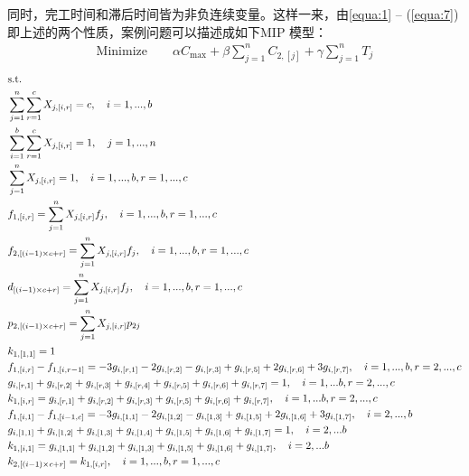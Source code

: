 同时，完工时间和滞后时间皆为非负连续变量。这样一来，由\eqref{equa:1} -- (\ref{equa:7})即上述的两个性质，案例问题可以描述成如下MIP 模型：
\begin{gather}
\text{Minimize}\qquad \alpha C_{\max}+\beta\sum_{j=1}^n C_{2,[j]}+\gamma\sum_{j=1}^n T_j \label{equa:8}
\end{gather}
\begin{align}
&\text{s.t.}\notag\\
& \sum_{j=1}^n\sum_{r=1}^c X_{j,[i,r]} = c,\quad i=1,...,b\label{equa:9}\\
& \sum_{i=1}^b\sum_{r=1}^c X_{j,[i,r]} = 1,\quad j=1,...,n\label{equa:10}\\
& \sum_{j=1}^n X_{j,[i,r]} = 1,\quad i=1,...,b, r=1,...,c\label{equa:11}\\
&f_{1,[i,r]} = \sum_{j=1}^n X_{j,[i,r]}f_j,\quad i=1,...,b, r=1,...,c\label{equa:12}\\
&f_{2,[(i-1)\times c + r]} = \sum_{j=1}^n X_{j,[i,r]}f_j,\quad i=1,...,b, r=1,...,c\label{equa:13}\\
&d_{[(i-1)\times c + r]} = \sum_{j=1}^n X_{j,[i,r]}f_j,\quad i=1,...,b, r=1,...,c\label{equa:14}\\
&p_{2,[(i-1)\times c + r]} = \sum_{j=1}^n X_{j,[i,r]}p_{2j}\label{equa:15}\\
&k_{1,[1,1]} = 1\label{equa:16}\\
&f_{1,[i,r]}-f_{1,[i,r-1]} = - 3g_{i,[r,1]} - 2g_{i,[r,2]} - g_{i,[r,3]} + g_{i,[r,5]} + 2g_{i,[r,6]} + 3g_{i,[r,7]},\quad i=1,...,b, r=2,...,c\label{equa:17}\\
&g_{i,[r,1]} + g_{i,[r,2]} + g_{i,[r,3]} + g_{i,[r,4]} + g_{i,[r,5]} + g_{i,[r,6]} + g_{i,[r,7]} = 1,\quad i=1,...b, r=2,...,c\label{equa:18}\\
&k_{1,[i,r]} = g_{i,[r,1]} + g_{i,[r,2]} + g_{i,[r,3]} + g_{i,[r,5]} + g_{i,[r,6]} + g_{i,[r,7]},\quad i=1,...b, r=2,...,c\label{equa:19}\\
&f_{1,[i,1]}-f_{1,[i-1,c]} = - 3g_{i,[1,1]} - 2g_{i,[1,2]} - g_{i,[1,3]} + g_{i,[1,5]} + 2g_{i,[1,6]} + 3g_{i,[1,7]},\quad i=2,...,b\label{equa:20}\\
&g_{i,[1,1]} + g_{i,[1,2]} + g_{i,[1,3]} + g_{i,[1,4]} + g_{i,[1,5]} + g_{i,[1,6]} + g_{i,[1,7]} = 1,\quad i=2,...b\label{equa:21}\\
&k_{1,[i,1]} = g_{i,[1,1]} + g_{i,[1,2]} + g_{i,[1,3]} + g_{i,[1,5]} + g_{i,[1,6]} + g_{i,[1,7]},\quad i=2,...b\label{equa:22}\\
&k_{2,[(i-1)\times c + r]} = k_{1,[i,r]},\quad i=1,...,b, r=1,...,c\label{equa:23}\\

\end{align}
